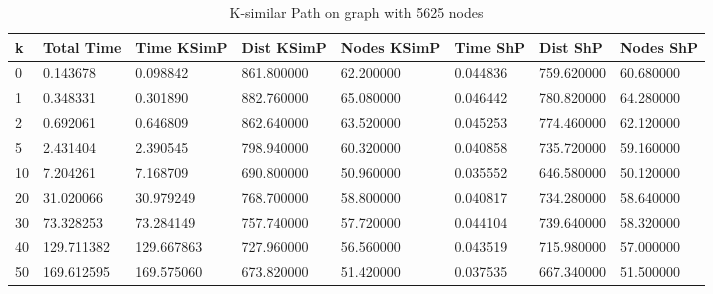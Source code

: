 \documentclass[]{article}
\numberwithin{equation}{section}
\begin{document}
\begin{appendices}
\begin{table}[H]
	\centering
	\small
	\setlength\tabcolsep{2pt}
	\begin{tabular}{|l|l|l|l|l|l|l|l|}
		\hline
		k  & Total Time & Time KSimP & Dist KSimP & Nodes KSimP & Time ShP & Dist ShP   & Nodes ShP \\ \hline
		0  & 0.143678   & 0.098842   & 861.800000 & 62.200000   & 0.044836 & 759.620000 & 60.680000 \\ \hline
		1  & 0.348331   & 0.301890   & 882.760000 & 65.080000   & 0.046442 & 780.820000 & 64.280000 \\ \hline
		2  & 0.692061   & 0.646809   & 862.640000 & 63.520000   & 0.045253 & 774.460000 & 62.120000 \\ \hline
		5  & 2.431404   & 2.390545   & 798.940000 & 60.320000   & 0.040858 & 735.720000 & 59.160000 \\ \hline
		10 & 7.204261   & 7.168709   & 690.800000 & 50.960000   & 0.035552 & 646.580000 & 50.120000 \\ \hline
		20 & 31.020066  & 30.979249  & 768.700000 & 58.800000   & 0.040817 & 734.280000 & 58.640000 \\ \hline
		30 & 73.328253  & 73.284149  & 757.740000 & 57.720000   & 0.044104 & 739.640000 & 58.320000 \\ \hline
		40 & 129.711382 & 129.667863 & 727.960000 & 56.560000   & 0.043519 & 715.980000 & 57.000000 \\ \hline
		50 & 169.612595 & 169.575060 & 673.820000 & 51.420000   & 0.037535 & 667.340000 & 51.500000 \\ \hline
	\end{tabular}
	\caption{K-similar Path on graph with 5625 nodes}
\end{table}


\end{appendices}
\end{document}
